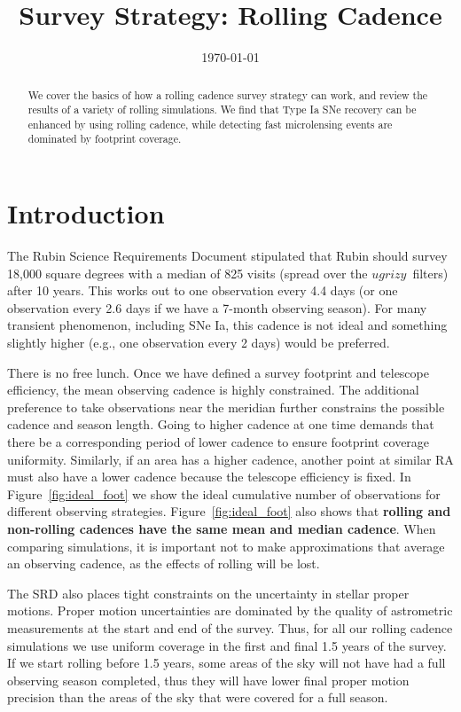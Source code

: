 \documentclass[modern]{aastex62}
\begin{document}

\date{\today}
\title{Survey Strategy: Rolling Cadence}

\begin{abstract}
We cover the basics of how a rolling cadence survey strategy can work, and review the results of a variety of rolling simulations. We find that Type Ia SNe recovery can be enhanced by using rolling cadence, while detecting fast microlensing events are dominated by footprint coverage.
\end{abstract}

\section{Introduction}

The Rubin Science Requirements Document \citep[SRD;][]{LPM-17} stipulated that Rubin should survey 18,000 square degrees with a median of 825 visits (spread over the $ugrizy$\ filters) after 10 years. This works out to one observation every 4.4 days (or one observation every 2.6 days if we have a 7-month observing season). For many transient phenomenon, including SNe Ia, this cadence is not ideal and something slightly higher (e.g., one observation every 2 days) would be preferred.

There is no free lunch. Once we have defined a survey footprint and telescope efficiency, the mean observing cadence is highly constrained. The additional preference to take observations near the meridian further constrains the possible cadence and season length. Going to higher cadence at one time demands that there be a corresponding period of lower cadence to ensure footprint coverage uniformity. Similarly, if an area has a higher cadence, another point at similar RA must also have a lower cadence because the telescope efficiency is fixed.  In Figure~\ref{fig:ideal_foot} we show the ideal cumulative number of observations for different observing strategies. Figure~\ref{fig:ideal_foot} also shows that {\bf{rolling and non-rolling cadences have the same mean and median cadence}}. When comparing simulations, it is important not to make approximations that average an observing cadence, as the effects of rolling will be lost.

The SRD also places tight constraints on the uncertainty in stellar proper motions. Proper motion uncertainties are dominated by the quality of astrometric measurements at the start and end of the survey. Thus, for all our rolling cadence simulations we use uniform coverage in the first and final 1.5 years of the survey. If we start rolling before 1.5 years, some areas of the sky will not have had a full observing season completed, thus they will have lower final proper motion precision than the areas of the sky that were covered for a full season.
\end{document}
